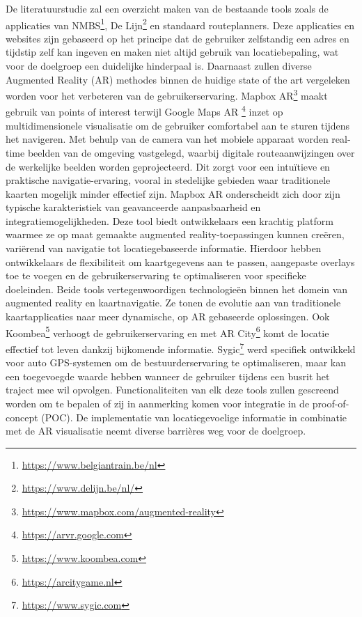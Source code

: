   De literatuurstudie zal een overzicht maken van de bestaande tools zoals de applicaties van NMBS\footnote{\url{https://www.belgiantrain.be/nl}}, De Lijn\footnote{\url{https://www.delijn.be/nl/}} en standaard routeplanners. 
  Deze applicaties en websites zijn gebaseerd op het principe dat de gebruiker zelfstandig een adres en tijdstip zelf kan ingeven en maken niet altijd gebruik van locatiebepaling, wat voor de doelgroep een duidelijke hinderpaal is.
    Daarnaast zullen diverse Augmented Reality (AR) methodes binnen de huidige state of the art vergeleken worden voor het verbeteren van de gebruikerservaring. 
    Mapbox AR\footnote{\url{https://www.mapbox.com/augmented-reality}} maakt gebruik van points of interest terwijl Google Maps AR \footnote{\url{https://arvr.google.com}} inzet op multidimensionele visualisatie om de gebruiker comfortabel aan te sturen tijdens het navigeren. 
    Met behulp van de camera van het mobiele apparaat worden real-time beelden van de omgeving vastgelegd, waarbij digitale routeaanwijzingen over de werkelijke beelden worden geprojecteerd. 
    Dit zorgt voor een intuïtieve en praktische navigatie-ervaring, vooral in stedelijke gebieden waar traditionele kaarten mogelijk minder effectief zijn. 
    Mapbox AR onderscheidt zich door zijn typische karakteristiek van geavanceerde aanpasbaarheid en integratiemogelijkheden. 
    Deze tool biedt ontwikkelaars een krachtig platform waarmee ze op maat gemaakte augmented reality-toepassingen kunnen creëren, variërend van navigatie tot locatiegebaseerde informatie. 
    Hierdoor hebben ontwikkelaars de flexibiliteit om kaartgegevens aan te passen, aangepaste overlays toe te voegen en de gebruikerservaring te optimaliseren voor specifieke doeleinden. 
    Beide tools vertegenwoordigen technologieën binnen het domein van augmented reality en kaartnavigatie. Ze tonen de evolutie aan van traditionele kaartapplicaties naar meer dynamische, op AR gebaseerde oplossingen.  
    Ook Koombea\footnote{\url{https://www.koombea.com}} verhoogt de gebruikerservaring en met AR City\footnote{\url{https://arcitygame.nl}} komt de locatie effectief tot leven dankzij bijkomende informatie. 
    Sygic\footnote{\url{https://www.sygic.com}} werd specifiek ontwikkeld voor auto GPS-systemen om de bestuurderservaring te optimaliseren, maar kan een toegevoegde waarde hebben wanneer de gebruiker tijdens een busrit het traject mee wil opvolgen. 
    Functionaliteiten van elk deze tools zullen gescreend worden om te bepalen of zij in aanmerking komen voor integratie in de proof-of-concept (POC). 
    De implementatie van locatiegevoelige informatie in combinatie met de AR visualisatie neemt diverse barrières weg voor de doelgroep. 

